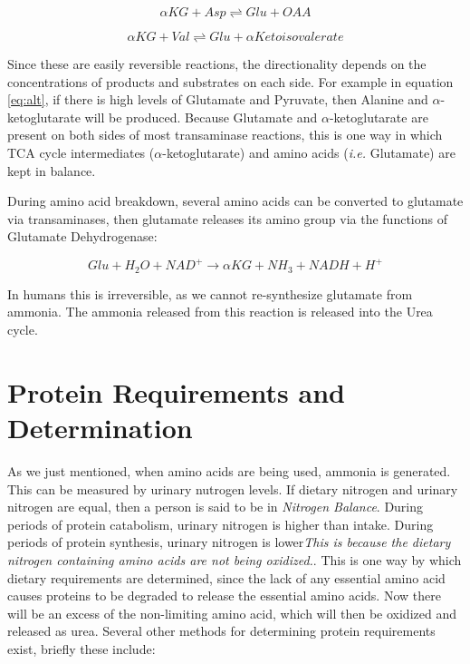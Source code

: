 \documentclass{tufte-handout}
\begin{document}
 \begin{equation}
\alpha KG + Asp \rightleftharpoons Glu + OAA
\end{equation}

 \begin{equation}
\alpha KG + Val \rightleftharpoons Glu +\alpha Ketoisovalerate
\end{equation}

Since these are easily reversible reactions, the directionality depends on the concentrations of products and substrates on each side.  For example in equation \ref{eq:alt}, if there is high levels of Glutamate and Pyruvate, then  Alanine and $\alpha$-ketoglutarate will be produced.  Because Glutamate and $\alpha$-ketoglutarate are present on both sides of most transaminase reactions, this is one way in which TCA cycle intermediates ($\alpha$-ketoglutarate) and amino acids (\textit{i.e.} Glutamate) are kept in balance.

  During amino acid breakdown, several amino acids can be converted to glutamate via transaminases, then glutamate releases its amino group via the functions of Glutamate Dehydrogenase:

\begin{equation}
Glu + H_2O + NAD^+  \rightarrow  \alpha KG + NH_3 + NADH + H^+
\end{equation}

In humans this is irreversible, as we cannot re-synthesize glutamate from ammonia.  The ammonia released from this reaction is released into the Urea cycle.

\section{Protein Requirements and Determination}
As we just mentioned, when amino acids are being used, ammonia is generated. This can be measured by urinary nutrogen levels.  If dietary nitrogen and urinary nitrogen are equal, then a person is said to be in \emph{Nitrogen Balance}.  During periods of protein catabolism, urinary nitrogen is higher than intake.  During periods of protein synthesis, urinary nitrogen is lower\emph{This is because the dietary nitrogen containing amino acids are not being oxidized.}.  This is one way by which dietary requirements are determined, since the lack of any essential amino acid causes proteins to be degraded to release the essential amino acids.  Now there will be an excess of the non-limiting amino acid, which will then be oxidized and released as urea.  Several other methods for determining protein requirements exist, briefly these include:
\end{document}
